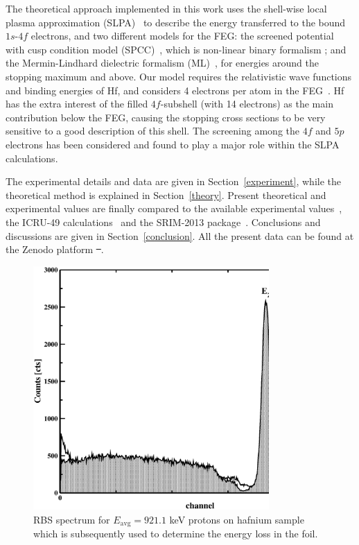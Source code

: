 \documentclass[aps,pra,reprint,groupedaddress,showpacs,showkeys]{revtex4-1} %
\providecommand{\DIFdel}[1]{{\protect\color{red}\sout{#1}}}                      %
\providecommand{\DIFdelbegin}{} %
\providecommand{\DIFdelend}{} %
\newcommand{\DIFscaledelfig}{0.5}
\newlength{\DIFdelgraphicswidth} %
\newlength{\DIFdelgraphicsheight} %
\newcommand{\DIFdelincludegraphics}[2][]{%
\sbox{\DIFdelgraphicsbox}{\DIFOincludegraphics[#1]{#2}}%
\settoboxwidth{\DIFdelgraphicswidth}{\DIFdelgraphicsbox} %
\settoboxtotalheight{\DIFdelgraphicsheight}{\DIFdelgraphicsbox} %
\scalebox{\DIFscaledelfig}{%
\parbox[b]{\DIFdelgraphicswidth}{\usebox{\DIFdelgraphicsbox}\\[-\baselineskip] \rule{\DIFdelgraphicswidth}{0em}}\llap{\resizebox{\DIFdelgraphicswidth}{\DIFdelgraphicsheight}{%
\setlength{\unitlength}{\DIFdelgraphicswidth}%
\begin{picture}(1,1)%
\thicklines\linethickness{2pt} %
{\color[rgb]{1,0,0}\put(0,0){\framebox(1,1){}}}%
{\color[rgb]{1,0,0}\put(0,0){\line( 1,1){1}}}%
{\color[rgb]{1,0,0}\put(0,1){\line(1,-1){1}}}%
\end{picture}%
}\hspace*{3pt}}} %
} %
\DeclareRobustCommand{\DIFdelbegin}{\DIFOdelbegin \let\includegraphics\DIFdelincludegraphics} %
\DeclareRobustCommand{\DIFdelend}{\DIFOaddend \let\includegraphics\DIFOincludegraphics} %
\begin{document}
The theoretical approach implemented in this work uses the shell-wise 
local plasma approximation (SLPA)~\cite{mon13} to describe the energy 
transferred to the bound $1s$-$4f$ electrons, and two different models 
for the FEG: the screened potential with cusp condition model (SPCC)~\cite{mon17}, 
which is non-linear binary formalism%
; and the Mermin-Lindhard dielectric 
formalism (ML)~\cite{Mermin}, for energies around the stopping maximum 
and above. Our model requires the relativistic wave functions and 
binding energies of Hf, and considers 4 electrons per atom in the 
FEG~\cite{mendez2019}. %
Hf has the extra interest of the filled 
$4f$-subshell (with 14 electrons) as the main contribution below the 
FEG, causing the stopping cross sections to be very sensitive to a good 
description of this shell. The screening among the $4f$ and $5p$ 
electrons has been considered and found to play a major role within the 
SLPA calculations.

The experimental details and data are given in Section~\ref{experiment}, 
while the theoretical method is explained in Section~\ref{theory}. 
Present theoretical and experimental values are finally compared to the 
available experimental values~\cite{Sirotinin}, the ICRU-49 
calculations~\cite{ICRU49} and the SRIM-2013 package~\cite{Ziegler01}. 
Conclusions and discussions are given in Section~\ref{conclusion}. All 
the present data can be found at the Zenodo platform \DIFdelbegin \DIFdel{~}\DIFdelend \cite{zenodo}.

\DIFdelbegin %

\DIFdelend %
\begin{figure}[!t]
\centering
\includegraphics[width=9cm]{Fig01.eps}
\caption{RBS spectrum for $E_{\mathrm{avg}}=921.1$ keV protons on 
hafnium sample which is subsequently used to determine the energy loss 
in the foil.}
\label{F01}
\end{figure}
\end{document}
